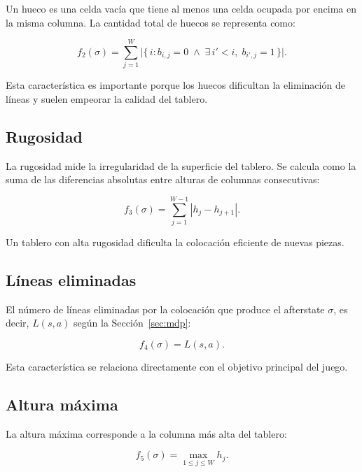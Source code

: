 Un hueco es una celda vacía que tiene al menos una celda ocupada por encima en la misma columna. La cantidad total de huecos se representa como:

\begin{equation}
    f_2(\sigma) =
    \sum_{j=1}^{W}
    \bigl|\{\, i : b_{i,j}=0 \;\wedge\; \exists\, i'<i,\; b_{i',j}=1 \,\}\bigr|.
\end{equation}

Esta característica es importante porque los huecos dificultan la eliminación de líneas y suelen empeorar la calidad del tablero.

\subsection{Rugosidad}

La rugosidad mide la irregularidad de la superficie del tablero. Se calcula como la suma de las diferencias absolutas entre alturas de columnas consecutivas:

\begin{equation}
    f_3(\sigma) =
    \sum_{j=1}^{W-1}
    |h_j - h_{j+1}|.
\end{equation}

Un tablero con alta rugosidad dificulta la colocación eficiente de nuevas piezas.

\subsection{Líneas eliminadas}

El número de líneas eliminadas por la colocación que produce el afterstate $\sigma$, es decir, $L(s,a)$ según la Sección~\ref{sec:mdp}:

\begin{equation}
    f_4(\sigma) =
    L(s,a).
\end{equation}

Esta característica se relaciona directamente con el objetivo principal del juego.

\subsection{Altura máxima}

La altura máxima corresponde a la columna más alta del tablero:

\begin{equation}
    f_5(\sigma) =
    \max_{1 \leq j \leq W} h_j.
\end{equation}

